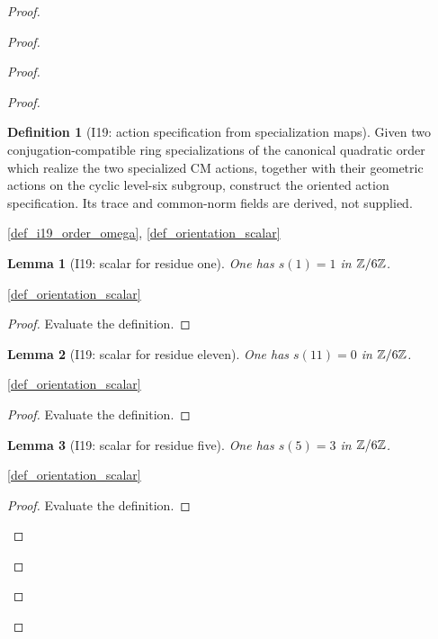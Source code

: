 \documentclass[11pt,a4paper]{article}
\numberwithin{equation}{section}
\theoremstyle{plain}\newtheorem{theorem}{Theorem}[section]\newaliascnt{proposition}{theorem}\newtheorem{proposition}[proposition]{Proposition}\aliascntresetthe{proposition}\newaliascnt{lemma}{theorem}\newtheorem{lemma}[lemma]{Lemma}\aliascntresetthe{lemma}
\theoremstyle{definition}\newaliascnt{definition}{theorem}\newtheorem{definition}[definition]{Definition}\aliascntresetthe{definition}\newaliascnt{notation}{theorem}\newtheorem{notation}[notation]{Notation}\aliascntresetthe{notation}
\providecommand{\lean}[1]{}\providecommand{\leanok}{}
\begin{document}
\begin{proof}
\begin{proof}
\begin{proof}
\begin{proof}
\begin{definition}[I19: action specification from specialization maps]\label{def_i19_action_from_maps}\lean{SptCM.Repair.OrientedSpecializedActions.ofQuadraticSpecializations}\leanok
Given two conjugation-compatible ring specializations of the canonical
quadratic order which realize the two specialized CM actions, together with
their geometric actions on the cyclic level-six subgroup, construct the
oriented action specification.  Its trace and common-norm fields are derived,
not supplied.
\end{definition}
\begin{uses-statement}\ref{def_i19_order_omega}, \ref{def_orientation_scalar}\end{uses-statement}

\begin{lemma}[I19: scalar for residue one]\label{lem_i19_scalar_one}\lean{SptCM.Repair.orientationScalar_one}\leanok
One has $s(1)=1$ in $\mathbb Z/6\mathbb Z$.
\end{lemma}
\begin{uses-statement}\ref{def_orientation_scalar}\end{uses-statement}
\begin{proof}Evaluate the definition.\end{proof}

\begin{lemma}[I19: scalar for residue eleven]\label{lem_i19_scalar_eleven}\lean{SptCM.Repair.orientationScalar_eleven}\leanok
One has $s(11)=0$ in $\mathbb Z/6\mathbb Z$.
\end{lemma}
\begin{uses-statement}\ref{def_orientation_scalar}\end{uses-statement}
\begin{proof}Evaluate the definition.\end{proof}

\begin{lemma}[I19: scalar for residue five]\label{lem_i19_scalar_five}\lean{SptCM.Repair.orientationScalar_five}\leanok
One has $s(5)=3$ in $\mathbb Z/6\mathbb Z$.
\end{lemma}
\begin{uses-statement}\ref{def_orientation_scalar}\end{uses-statement}
\begin{proof}Evaluate the definition.\end{proof}


\end{proof}
\end{proof}
\end{proof}
\end{proof}
\end{document}
